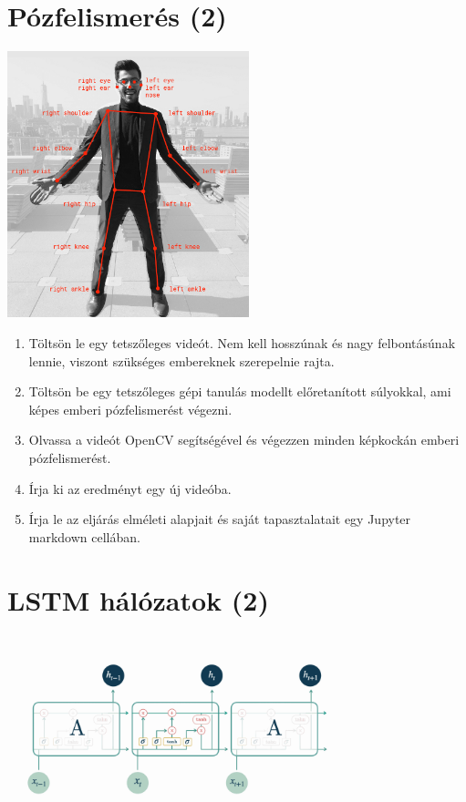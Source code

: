 \documentclass[english]{article}
\begin{document}
\section{Pózfelismerés (2)}
\begin{center}
\includegraphics[width=7cm, keepaspectratio]{images/pose_detection.png}
\end{center}
\begin{enumerate}
	\item Töltsön le egy tetszőleges videót. Nem kell hosszúnak és nagy felbontásúnak lennie, viszont szükséges embereknek szerepelnie rajta. 
	\item Töltsön be egy tetszőleges gépi tanulás modellt előretanított súlyokkal, ami képes emberi pózfelismerést végezni.
	\item Olvassa a videót OpenCV segítségével és végezzen minden képkockán emberi pózfelismerést.
	\item Írja ki az eredményt egy új videóba. 
	\item Írja le az eljárás elméleti alapjait és saját tapasztalatait egy Jupyter markdown cellában.
\end{enumerate}

\section{LSTM hálózatok (2)}
\begin{center}
\includegraphics[width=10cm, keepaspectratio]{images/lstm.png}
\end{center}
\end{document}

